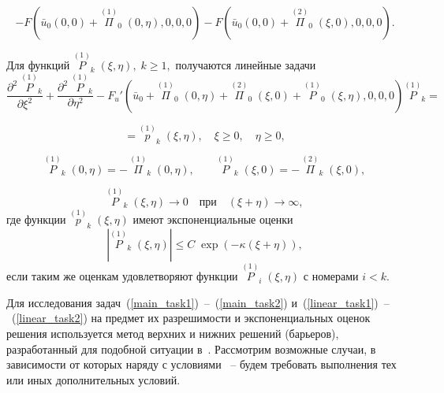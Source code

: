 \documentclass[12pt]{article}
\newcommand{\RNumb}[1]{\uppercase\expandafter{\romannumeral #1\relax}}
\begin{document}
\begin{equation} \label {P0F}
	-F \left( \bar u_0(0, 0) + \overset{(1)}{\Pi}_0 \; (0, \eta), 0, 0, 0 \right) -F \left( \bar u_0(0, 0) + \overset{(2)}{\Pi}_0 \; (\xi, 0), 0, 0, 0 \right). 
\end{equation}

Для функций $\overset{(1)}{P}_k \; (\xi, \eta), \; k \ge 1,$ получаются линейные задачи
\begin{equation*}
	\frac{\partial^2 \; \overset{(1)}{P}_k}{\partial \xi^2} + \frac{\partial^2 \; \overset{(1)}{P}_k}{\partial \eta^2} -
F_u' \left( \bar u_0 + \overset{(1)}{\Pi}_0 \; (0, \eta) +  \overset{(2)}{\Pi}_0 \; (\xi, 0) + \overset{(1)}{P}_0 \; (\xi, \eta), 0, 0, 0 \right) \overset{(1)}{P}_k =
\end{equation*}

\begin{equation} \label {linear_task1}
	= \overset{(1)}{p}_k \; (\xi, \eta), \quad \xi \ge 0, \quad \eta \ge 0,
\end{equation}

\begin{equation}
	\overset{(1)}{P}_k \; (0, \eta) = -\, \overset{(1)}{\Pi}_k \; (0, \eta), \qquad
\overset{(1)}{P}_k \; (\xi, 0) = -\, \overset{(2)}{\Pi}_k \; (\xi, 0),
\end{equation}

\begin{equation} \label {linear_task2}
	\overset{(1)}{P}_k \; (\xi, \eta) \to 0 \quad \text{при} \quad (\xi + \eta) \to \infty,
\end{equation}
где функции $\overset{(1)}{p}_k \; (\xi, \eta)$ имеют экспоненциальные оценки
\begin{equation} \label {exp_estimate}
	\left| \overset{(1)}{P}_k \; (\xi, \eta) \right| \le C \; \exp(-\kappa(\xi + \eta)),
\end{equation}
если таким же оценкам удовлетворяют функции $\overset{(1)}{P}_i \; (\xi, \eta)$ с номерами $i < k$.

Для исследования задач~(\ref {main_task1})~--~(\ref {main_task2}) и~(\ref {linear_task1})~--~(\ref {linear_task2}) на предмет их разрешимости и экспоненциальных оценок решения используется метод верхних и нижних решений (барьеров), разработанный для подобной ситуации в~\cite{denisov1, denisov2}. Рассмотрим возможные случаи, в зависимости от которых наряду с условиями \RNumb{1}~-- \RNumb{4} будем требовать выполнения тех или иных дополнительных условий.
\end{document}
